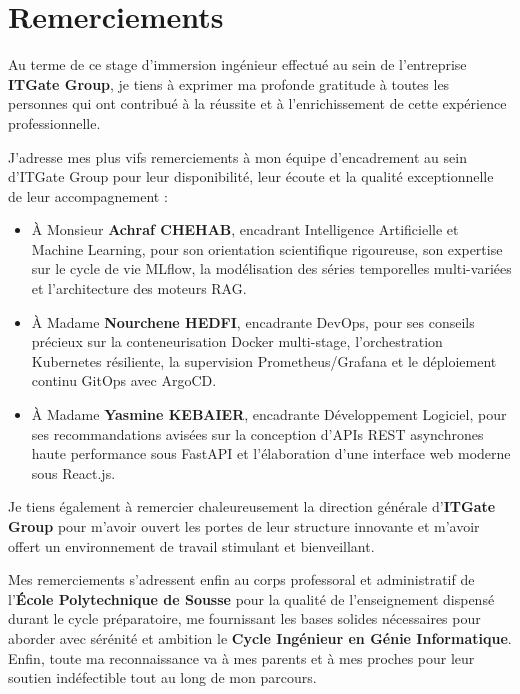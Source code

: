 \documentclass[11pt,a4paper,oneside]{report}
\begin{document}

\section*{Remerciements}

Au terme de ce stage d'immersion ingénieur effectué au sein de l'entreprise \textbf{ITGate Group}, je tiens à exprimer ma profonde gratitude à toutes les personnes qui ont contribué à la réussite et à l'enrichissement de cette expérience professionnelle.

J'adresse mes plus vifs remerciements à mon équipe d'encadrement au sein d'ITGate Group pour leur disponibilité, leur écoute et la qualité exceptionnelle de leur accompagnement :
\begin{itemize}[leftmargin=1.2cm, itemsep=1pt]
    \item À Monsieur \textbf{Achraf CHEHAB}, encadrant Intelligence Artificielle et Machine Learning, pour son orientation scientifique rigoureuse, son expertise sur le cycle de vie MLflow, la modélisation des séries temporelles multi-variées et l'architecture des moteurs RAG.
    \item À Madame \textbf{Nourchene HEDFI}, encadrante DevOps, pour ses conseils précieux sur la conteneurisation Docker multi-stage, l'orchestration Kubernetes résiliente, la supervision Prometheus/Grafana et le déploiement continu GitOps avec ArgoCD.
    \item À Madame \textbf{Yasmine KEBAIER}, encadrante Développement Logiciel, pour ses recommandations avisées sur la conception d'APIs REST asynchrones haute performance sous FastAPI et l'élaboration d'une interface web moderne sous React.js.
\end{itemize}

Je tiens également à remercier chaleureusement la direction générale d'\textbf{ITGate Group} pour m'avoir ouvert les portes de leur structure innovante et m'avoir offert un environnement de travail stimulant et bienveillant.

Mes remerciements s'adressent enfin au corps professoral et administratif de l'\textbf{École Polytechnique de Sousse} pour la qualité de l'enseignement dispensé durant le cycle préparatoire, me fournissant les bases solides nécessaires pour aborder avec sérénité et ambition le \textbf{Cycle Ingénieur en Génie Informatique}. Enfin, toute ma reconnaissance va à mes parents et à mes proches pour leur soutien indéfectible tout au long de mon parcours.
\end{document}
